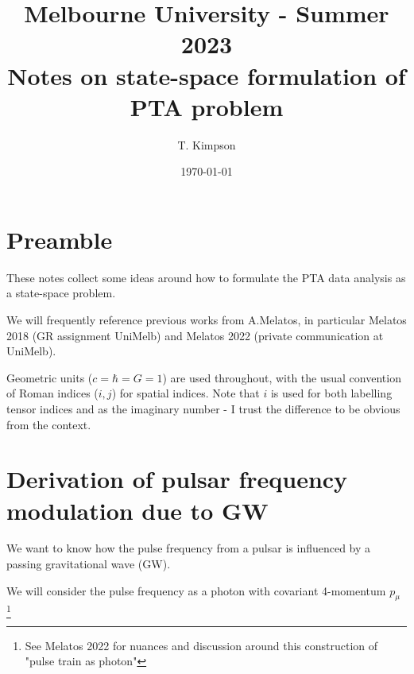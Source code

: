 \documentclass{tufte-handout} %
\title{	
	\normalfont\normalsize 
	{Melbourne University - Summer 2023} \\ [0pt] %
	\huge Notes on state-space formulation of PTA problem%
}\author{T. Kimpson} %
\date{\vspace{-5pt}\normalsize\today} %
\begin{document}
\justifying 
\maketitle


\tableofcontents




\section{Preamble}


These notes collect some ideas around how to formulate the PTA data analysis as a state-space problem. \newline 

\noindent We will frequently reference previous works from A.Melatos, in particular Melatos 2018 (GR assignment UniMelb) and Melatos 2022 (private communication at UniMelb). \newline 

\noindent Geometric units ($c=\hbar = G = 1$) are used throughout, with the usual convention of Roman indices ($i,j$) for spatial indices. Note that $i$ is used for both labelling tensor indices and as the imaginary number - I trust the difference to be obvious from the context.\newline



\section{Derivation of pulsar frequency modulation due to GW}
We want to know how the pulse frequency from a pulsar is influenced by a passing gravitational wave (GW). \newline 

\noindent We will consider the pulse frequency as a photon with covariant 4-momentum $p_{\mu}$  \footnote{See Melatos 2022 for nuances and discussion around this construction of "pulse train as photon"} \newline 
\end{document}
